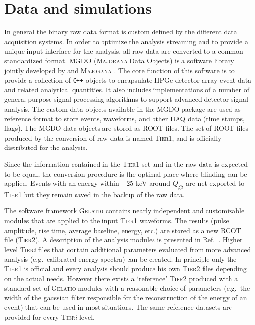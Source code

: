 \section{Data and simulations}\label{sec:data}
 In general the binary raw data format is custom defined by the different data acquisition systems. In order to optimize the analysis streaming and to provide a unique input interface for the analysis, all raw data are converted to a common standardized format. MGDO \cite{MGDO} (\textsc{Majorana} {\gerda} Data Objects) is a software library jointly developed by {\gerda} and \textsc{Majorana} \cite{majoranadem}. The core function of this software is to provide a collection of \texttt{C++} objects to encapsulate HPGe detector array event data and related analytical quantities. It also includes implementations of a number of general-purpose signal processing algorithms to support advanced detector signal analysis. The custom data objects available in the MGDO package are used as reference format to store events, waveforms, and other DAQ data (time stamps, flags). The MGDO data objects are stored as ROOT \cite{ROOT} files. The set of ROOT files produced by the conversion of raw data is named \textsc{Tier1}, and is officially distributed for the analysis.

Since the information contained in the \textsc{Tier1} set and in the raw data is expected to be equal, the conversion procedure is the optimal place where blinding can be applied. Events with an energy within $\pm$25 keV around $Q_{\beta\beta}$ are not exported to \textsc{Tier1} but they remain saved in the backup of the raw data.

The software framework \textsc{Gelatio} \cite{GELATIO} contains nearly independent and customizable modules that are applied to the input \textsc{Tier1} waveforms. The results (pulse amplitude, rise time, average baseline, energy, etc.) are stored as a new ROOT file (\textsc{Tier2}). A description of the analysis modules is presented in Ref.~\cite{dataproc}. Higher level \textsc{Tier}\emph{i} files that contain additional parameters evaluated from more advanced analysis (e.g.~calibrated energy spectra) can be created. In principle only the \textsc{Tier1} is official and every analysis should produce his own \textsc{Tier2} files depending on the actual needs. However there exists a `reference' \textsc{Tier2} produced with a standard set of \textsc{Gelatio} modules with a reasonable choice of parameters (e.g.~the width of the gaussian filter responsible for the reconstruction of the energy of an event) that can be used in most situations. The same reference datasets are provided for every \textsc{Tier}\emph{i} level.

